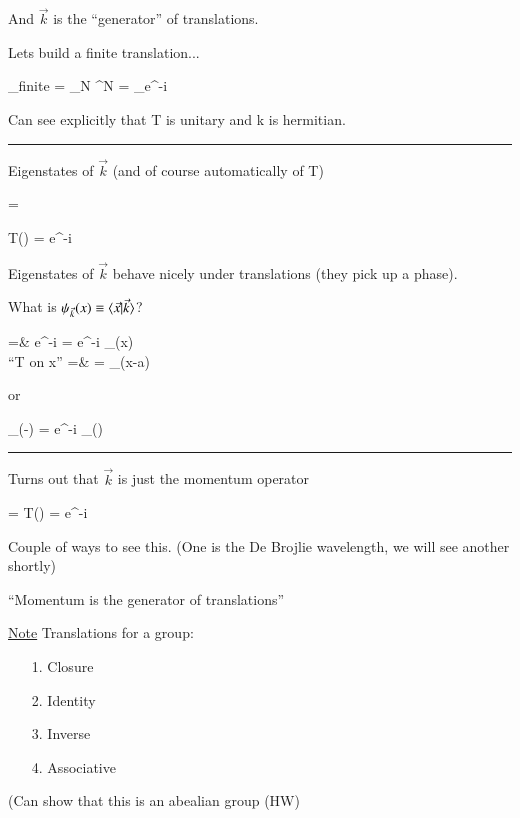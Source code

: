 {And $\vec{k}$ is the ``generator'' of translations.


Lets build a finite translation...

\be
{}_{finite} = \lim\limits_{N \to \infty}^N = _{e^{-i\cdot{}}}
\ee


Can see explicitly that T is unitary and k is hermitian. 


\noindent\rule{\textwidth}{1pt}

Eigenstates of $\vec{k}$ (and of course automatically of T)

\be
{} =  
\ee


\be
T() = e^{-i\cdot{}} 
\ee

Eigenstates of $\vec{k}$ behave nicely under translations (they pick up a phase).

What is $\psi_{\vec{k}}(x) \equiv \braket{\vec{x}|\vec{k}} $?

\bea
{} =& e^{-i\cdot{}}  = e^{-i\cdot{}} \psi_{}(x)\\
\textrm{``T on x''}  =&  = \psi_{}(x-a)\\
\eea

or

\be
\psi_{}(-) = e^{-i\cdot{}} \psi_{}()
\ee

\noindent\rule{\textwidth}{1pt}

Turns out that $\vec{k}$ is just the momentum operator 

\begin{tcolorbox}
\be
{} = \hbar {}    T() = e^{-i}
\ee
\end{tcolorbox}


Couple of ways to see this. (One is the De Brojlie wavelength, we will see another shortly)


``Momentum is the generator of translations''

\underline{Note} Translations for a group: 
\begin{itemize}
\item[1.] Closure
\item[2.] Identity
\item[3.] Inverse
\item[4.] Associative
\end{itemize}
(Can show that this is an abealian group (HW)

}
